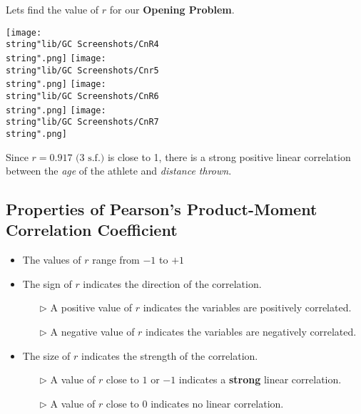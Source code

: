 \documentclass[11pt,a4paper]{book}
\begin{document}
\medskip

Lets find the value of $r$ for our \textbf{Opening Problem}.
\begin{center}

\texttt{[image: \\string"lib/GC Screenshots/CnR4\\string".png]}
\texttt{[image: \\string"lib/GC Screenshots/Cnr5\\string".png]}
\texttt{[image: \\string"lib/GC Screenshots/CnR6\\string".png]}
\texttt{[image: \\string"lib/GC Screenshots/CnR7\\string".png]}
\par\end{center}

Since $r=0.917\text{ (3 s.f.)}$ is close to 1, there is a strong
positive linear correlation between the \textit{age} of the athlete
and \textit{distance thrown}.

\newpage

\subsection{Properties of Pearson's Product-Moment Correlation Coefficient}

\begin{itemize}

\item The values of $r$ range from $-1$ to $+1$

\item The sign of $r$ indicates the direction of the correlation.

\begin{itemize}

\item[$\triangleright$]  A positive value of $r$ indicates the variables
are positively correlated.

\item[$\triangleright$]  A negative value of $r$ indicates the variables
are negatively correlated.

\end{itemize}

\item  The size of $r$ indicates the strength of the correlation.

\begin{itemize}

\item[$\triangleright$]  A value of $r$ close to $1$ or $-1$ indicates
a \textbf{strong} linear correlation.

\item[$\triangleright$]  A value of $r$ close to $0$ indicates
no linear correlation.

\end{itemize}

\end{itemize}
\end{document}
